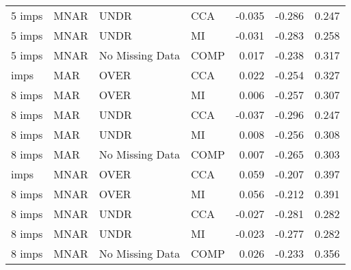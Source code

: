 \documentclass[
  letterpaper,
  DIV=11,
  numbers=noendperiod]{scrartcl}
\begin{document}
\begin{tabular}[t]{llllrrr}
5 imps & MNAR & UNDR & CCA & -0.035 & -0.286 & 0.247\\
5 imps & MNAR & UNDR & MI & -0.031 & -0.283 & 0.258\\
5 imps & MNAR & No Missing Data & COMP & 0.017 & -0.238 & 0.317\\
\addlinespace
8 imps & MAR & OVER & CCA & 0.022 & -0.254 & 0.327\\
8 imps & MAR & OVER & MI & 0.006 & -0.257 & 0.307\\
8 imps & MAR & UNDR & CCA & -0.037 & -0.296 & 0.247\\
8 imps & MAR & UNDR & MI & 0.008 & -0.256 & 0.308\\
8 imps & MAR & No Missing Data & COMP & 0.007 & -0.265 & 0.303\\
\addlinespace
8 imps & MNAR & OVER & CCA & 0.059 & -0.207 & 0.397\\
8 imps & MNAR & OVER & MI & 0.056 & -0.212 & 0.391\\
8 imps & MNAR & UNDR & CCA & -0.027 & -0.281 & 0.282\\
8 imps & MNAR & UNDR & MI & -0.023 & -0.277 & 0.282\\
8 imps & MNAR & No Missing Data & COMP & 0.026 & -0.233 & 0.356\\
\bottomrule
\end{tabular}
\end{document}
